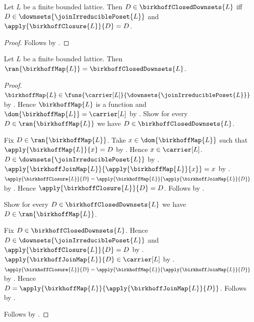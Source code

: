 \begin{proposition}\label{birkhoff_closed_downsets_iff}
    Let $L$ be a finite bounded lattice.
    Then $D\in\birkhoffClosedDownsets{L}$ iff
        $D\in\downsets{\joinIrreduciblePoset{L}}$ and
        $\apply{\birkhoffClosure{L}}{D}=D$.
\end{proposition}
\begin{proof}
    Follows by .
\end{proof}

\begin{theorem}\label{birkhoff_map_range_eq_closed_downsets}
    Let $L$ be a finite bounded lattice.
    Then $\ran{\birkhoffMap{L}}=\birkhoffClosedDownsets{L}$.
\end{theorem}
\begin{proof}
    $\birkhoffMap{L}\in
        \funs{\carrier[L]}{\downsets{\joinIrreduciblePoset{L}}}$ by
        .
    Hence $\birkhoffMap{L}$ is a function and
        $\dom{\birkhoffMap{L}}=\carrier[L]$ by
        .
    Show for every $D\in\ran{\birkhoffMap{L}}$ we have
        $D\in\birkhoffClosedDownsets{L}$.
    \begin{subproof}
        Fix $D\in\ran{\birkhoffMap{L}}$.
        Take $x\in\dom{\birkhoffMap{L}}$ such that
            $\apply{\birkhoffMap{L}}{x}=D$ by .
        Hence $x\in\carrier[L]$.
        $D\in\downsets{\joinIrreduciblePoset{L}}$ by
            .
        $\apply{\birkhoffJoinMap{L}}
            {\apply{\birkhoffMap{L}}{x}}=x$ by
            .
        $\apply{\birkhoffClosure{L}}{D}
            =\apply{\birkhoffMap{L}}
                {\apply{\birkhoffJoinMap{L}}{D}}$ by
            .
        Hence $\apply{\birkhoffClosure{L}}{D}=D$.
        Follows by .
    \end{subproof}
    Show for every $D\in\birkhoffClosedDownsets{L}$ we have
        $D\in\ran{\birkhoffMap{L}}$.
    \begin{subproof}
        Fix $D\in\birkhoffClosedDownsets{L}$.
        Hence $D\in\downsets{\joinIrreduciblePoset{L}}$ and
            $\apply{\birkhoffClosure{L}}{D}=D$ by
            .
        $\apply{\birkhoffJoinMap{L}}{D}\in\carrier[L]$ by
            .
        $\apply{\birkhoffClosure{L}}{D}
            =\apply{\birkhoffMap{L}}
                {\apply{\birkhoffJoinMap{L}}{D}}$ by
            .
        Hence $D=\apply{\birkhoffMap{L}}
            {\apply{\birkhoffJoinMap{L}}{D}}$.
        Follows by .
    \end{subproof}
    Follows by .
\end{proof}

